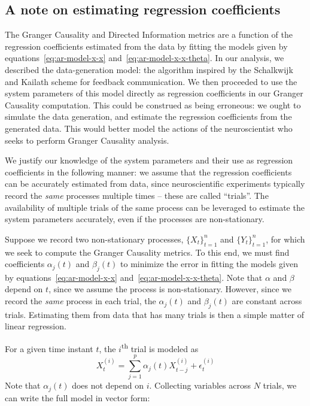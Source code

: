 \documentclass[letterpaper, 10pt, conference]{ieeeconf}
\begin{document}

\subsection{A note on estimating regression coefficients}
\label{sec:estimating-ar-coeffs}

The Granger Causality and Directed Information metrics are a function of the regression coefficients estimated from the data by fitting the models given by equations~\eqref{eq:ar-model-x-x} and~\eqref{eq:ar-model-x-x-theta}. In our analysis, we described the data-generation model: the algorithm inspired by the Schalkwijk and Kailath scheme for feedback communication. We then proceeded to use the system parameters of this model directly as regression coefficients in our Granger Causality computation. This could be construed as being erroneous: we ought to simulate the data generation, and estimate the regression coefficients from the generated data. This would better model the actions of the neuroscientist who seeks to perform Granger Causality analysis.

We justify our knowledge of the system parameters and their use as regression coefficients in the following manner: we assume that the regression coefficients can be accurately estimated from data, since neuroscientific experiments typically record the \emph{same} processes multiple times -- these are called ``trials''. The availability of multiple trials of the same process can be leveraged to estimate the system parameters accurately, even if the processes are non-stationary.

Suppose we record two non-stationary processes, $\{X_t\}_{t=1}^n$ and $\{Y_t\}_{t=1}^n$, for which we seek to compute the Granger Causality metrics. To this end, we must find coefficients $\alpha_j(t)$ and $\beta_j(t)$ to minimize the error in fitting the models given by equations~\eqref{eq:ar-model-x-x} and~\eqref{eq:ar-model-x-x-theta}. Note that $\alpha$ and $\beta$ depend on $t$, since we assume the process is non-stationary. However, since we record the \emph{same} process in each trial, the $\alpha_j(t)$ and $\beta_j(t)$ are constant across trials. Estimating them from data that has many trials is then a simple matter of linear regression.

For a given time instant $t$, the $i$\textsuperscript{th} trial is modeled as
\begin{equation*}
	X_t^{(i)} = \sum_{j=1}^p \alpha_j(t) X_{t-j}^{(i)} + \epsilon_t^{(i)}
\end{equation*}
Note that $\alpha_j(t)$ does not depend on $i$. Collecting variables across $N$ trials, we can write the full model in vector form:
\end{document}

